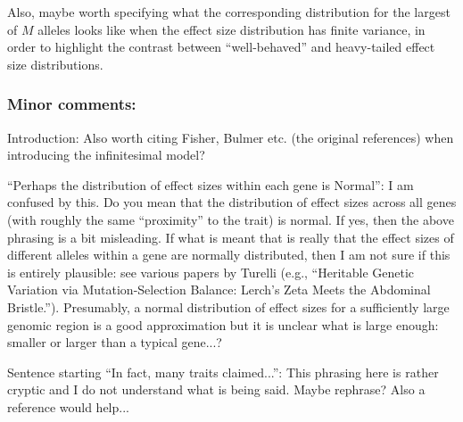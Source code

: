 \reply{
}

\begin{point}{}
Also, maybe worth specifying what the corresponding distribution for the largest of $M$ alleles looks like when the effect size distribution has finite variance, in order to highlight the contrast between ``well-behaved'' and heavy-tailed effect size distributions.
\end{point}


\subsubsection*{Minor comments:}

\begin{point}{}
    Introduction: Also worth citing Fisher, Bulmer etc. (the original references) when introducing the infinitesimal model?
\end{point}

\reply{
}

\begin{point}{\revref}
    ``Perhaps the distribution of effect sizes within each gene is Normal'': I am confused by this. Do you mean that the distribution of effect sizes across all genes (with roughly the same ``proximity'' to the trait) is normal. If yes, then the above phrasing is a bit misleading. If what is meant that is really that the effect sizes of different alleles within a gene are normally distributed, then I am not sure if this is entirely plausible: see various papers by Turelli (e.g., ``Heritable Genetic Variation via Mutation-Selection Balance: Lerch's Zeta Meets the Abdominal Bristle.''). Presumably, a normal distribution of effect sizes for a sufficiently large genomic region is a good approximation but it is unclear what is large enough: smaller or larger than a typical gene...?
\end{point}


\begin{point}{\revref}
    Sentence starting ``In fact, many traits claimed...'': This phrasing here is rather cryptic and I do not understand what is being said. Maybe rephrase? Also a reference would help...
\end{point}

